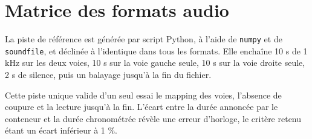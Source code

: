 \section{Matrice des formats audio}
\label{ann:mesures_formats}

La piste de référence est générée par script Python, à l'aide de \texttt{numpy} et de \texttt{soundfile}, et déclinée à l'identique dans tous les formats. Elle enchaîne 10 s de 1 kHz sur les deux voies, 10 s sur la voie gauche seule, 10 s sur la voie droite seule, 2 s de silence, puis un balayage jusqu'à la fin du fichier.

Cette piste unique valide d'un seul essai le mapping des voies, l'absence de coupure et la lecture jusqu'à la fin. L'écart entre la durée annoncée par le conteneur et la durée chronométrée révèle une erreur d'horloge, le critère retenu étant un écart inférieur à 1 \%.

